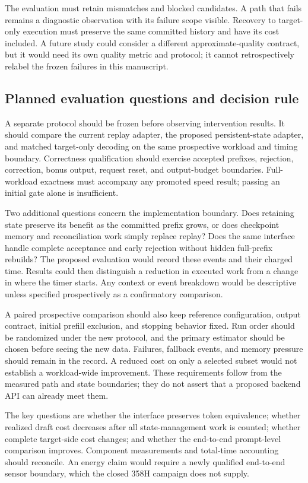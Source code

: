 The evaluation must retain mismatches and blocked candidates. A path that fails remains a diagnostic observation with its failure scope visible. Recovery to target-only execution must preserve the same committed history and have its cost included. A future study could consider a different approximate-quality contract, but it would need its own quality metric and protocol; it cannot retrospectively relabel the frozen failures in this manuscript.

\subsection{Planned evaluation questions and decision rule}
A separate protocol should be frozen before observing intervention results. It should compare the current replay adapter, the proposed persistent-state adapter, and matched target-only decoding on the same prospective workload and timing boundary. Correctness qualification should exercise accepted prefixes, rejection, correction, bonus output, request reset, and output-budget boundaries. Full-workload exactness must accompany any promoted speed result; passing an initial gate alone is insufficient.

Two additional questions concern the implementation boundary. Does retaining state preserve its benefit as the committed prefix grows, or does checkpoint memory and reconciliation work simply replace replay? Does the same interface handle complete acceptance and early rejection without hidden full-prefix rebuilds? The proposed evaluation would record these events and their charged time. Results could then distinguish a reduction in executed work from a change in where the timer starts. Any context or event breakdown would be descriptive unless specified prospectively as a confirmatory comparison.

A paired prospective comparison should also keep reference configuration, output contract, initial prefill exclusion, and stopping behavior fixed. Run order should be randomized under the new protocol, and the primary estimator should be chosen before seeing the new data. Failures, fallback events, and memory pressure should remain in the record. A reduced cost on only a selected subset would not establish a workload-wide improvement. These requirements follow from the measured path and state boundaries; they do not assert that a proposed backend API can already meet them.

The key questions are whether the interface preserves token equivalence; whether realized draft cost decreases after all state-management work is counted; whether complete target-side cost changes; and whether the end-to-end prompt-level comparison improves. Component measurements and total-time accounting should reconcile. An energy claim would require a newly qualified end-to-end sensor boundary, which the closed 358H campaign does not supply.

